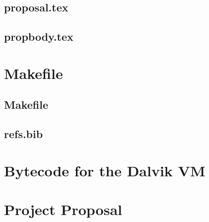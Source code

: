 \documentclass[12pt,twoside,notitlepage]{report}
\begin{document}
\section{proposal.tex}
{\scriptsize}

\section{propbody.tex}
{\scriptsize}



\cleardoublepage

\chapter{Makefile}

\section{\label{makefile}Makefile}
{\scriptsize}

\section{refs.bib}
{\scriptsize}


\cleardoublepage

\chapter{Bytecode for the Dalvik VM}

% 


\cleardoublepage

\chapter{Project Proposal}


\end{document}
